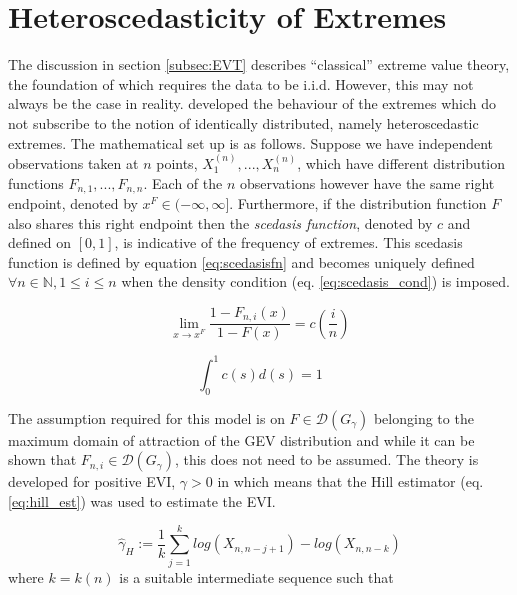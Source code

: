 \section{Heteroscedasticity of Extremes} \label{subsec:sced}

The discussion in section \ref{subsec:EVT} describes ``classical'' extreme value theory, the foundation of which requires the data to be i.i.d. However, this may not always be the case in reality. \cite{einmahl16} developed the behaviour of the extremes which do not subscribe to the notion of identically distributed, namely heteroscedastic extremes. The mathematical set up is as follows. Suppose we have independent observations taken at $n$ points, $X_1^{(n)} , ... , X_n^{(n)}$, which have different distribution functions $F_{n,1}, ... , F_{n,n}$. Each of the $n$ observations however have the same right endpoint, denoted by $x^F \in (-\infty, \infty]$. Furthermore, if the distribution function $F$ also shares this right endpoint then the \textit{scedasis function}, denoted by $c$ and defined on $[0,1]$, is indicative of the frequency of extremes. This scedasis function is defined by equation \ref{eq:scedasisfn} and becomes uniquely defined  $\forall n \in \mathbb{N}, 1 \le i \le n$ when the density condition (eq. \ref{eq:scedasis_cond}) is imposed.


\begin{equation} \label{eq:scedasisfn}
\lim_{x \rightarrow x^F} \frac{1-F_{n,i}(x)}{1 - F(x)} = c(\frac{i}{n})
\end{equation}

\begin{equation} \label{eq:scedasis_cond}
\int_0^1 c(s)d(s) = 1
\end{equation}

The assumption required for this model is on $F  \in \mathcal{D}(G_{\gamma})$ belonging to the maximum domain of attraction of the GEV distribution and while it can be shown that $F_{n,i}  \in \mathcal{D}(G_{\gamma})$, this does not need to be assumed.  The theory is developed for positive EVI, $\gamma > 0 $ in \citet{einmahl16} which means that the Hill estimator (eq. \ref{eq:hill_est}) was used to estimate the EVI.

\begin{equation} \label{eq:hill_est}
\hat{\gamma}_H := \frac{1}{k} \sum_{j=1}^k log(X_{n,n-j+1}) - log(X_{n,n-k})
\end{equation}
where $k=k(n)$ is a suitable intermediate sequence such that 

